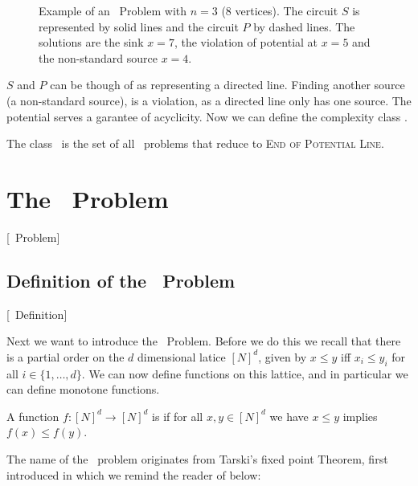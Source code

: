 \begin{figure}[ht]
    \centering
    \caption[Example of an \EOPL\ Problem]{Example of an \EOPL\ Problem with $n=3$ (8 vertices).
        The circuit $S$ is represented by solid lines and the circuit $P$ by dashed lines.
        The solutions are the sink $x=7$, the violation of potential at $x=5$ and the non-standard source $x=4$.}
    \label{fig:eopl_example}
\end{figure}

$S$ and $P$ can be though of as representing a directed line. Finding another source (a non-standard source), is a violation, as a directed line only has one source. The potential serves a garantee of acyclicity. Now we can define the complexity class \EOPL.

\begin{definition}[\EOPL]
    The class \EOPL\ is the set of all \TFNP\ problems that reduce to \textsc{End of Potential Line}.
\end{definition}

\section{The \Tarski\ Problem}[\Tarski\ Problem]
\label{sec:tarski_problem}

\subsection{Definition of the \Tarski\ Problem}[\Tarski\ Definition]

Next we want to introduce the \Tarski\ Problem. Before we do this we recall that there is a partial order on the $d$ dimensional latice ${[N]}^d$, given by $x \leq y$ iff $x_i \leq y_i$ for all $i \in \{1, \dots, d\}$. We can now define functions on this lattice, and in particular we can define monotone functions.

\begin{definition}
    A function $f : {[N]}^d \rightarrow {[N]}^d$ is  if for all $x, y \in {[N]}^d$ we have $x \leq y$ implies $f(x) \leq f(y)$.
\end{definition}

The name of the \Tarski\ problem originates from Tarski's fixed point Theorem, first introduced in  which we remind the reader of below:

